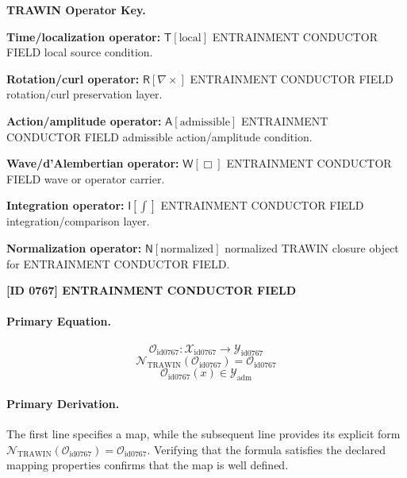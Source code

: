 \par\vspace{0.45\baselineskip}
\noindent\begin{minipage}[t]{\linewidth}
\begingroup
\small
\raggedright
\textbf{TRAWIN Operator Key.}\par
\noindent\textbf{Time/localization operator:} $\mathsf{T}\!\left[\mathrm{local}\right]$ ENTRAINMENT CONDUCTOR FIELD local source condition.\par
\noindent\textbf{Rotation/curl operator:} $\mathsf{R}\!\left[\nabla\times\right]$ ENTRAINMENT CONDUCTOR FIELD rotation/curl preservation layer.\par
\noindent\textbf{Action/amplitude operator:} $\mathsf{A}\!\left[\mathrm{admissible}\right]$ ENTRAINMENT CONDUCTOR FIELD admissible action/amplitude condition.\par
\noindent\textbf{Wave/d'Alembertian operator:} $\mathsf{W}\!\left[\Box\right]$ ENTRAINMENT CONDUCTOR FIELD wave or operator carrier.\par
\noindent\textbf{Integration operator:} $\mathsf{I}\!\left[\int\right]$ ENTRAINMENT CONDUCTOR FIELD integration/comparison layer.\par
\noindent\textbf{Normalization operator:} $\mathsf{N}\!\left[\mathrm{normalized}\right]$ normalized TRAWIN closure object for ENTRAINMENT CONDUCTOR FIELD.\par
\endgroup
\end{minipage}

\clearpage
\noindent\textbf{[ID 0767] ENTRAINMENT CONDUCTOR FIELD}\par
\vspace{0.35em}
\paragraph{Primary Equation.}
\[
\mathcal{O}_{\mathrm{id0767}}:\mathcal{X}_{\mathrm{id0767}}\longrightarrow\mathcal{Y}_{\mathrm{id0767}}
\]
\[
\mathcal{N}_{\mathrm{TRAWIN}}(\mathcal{O}_{\mathrm{id0767}})=\mathcal{O}_{\mathrm{id0767}}
\]
\[
\mathcal{O}_{\mathrm{id0767}}(x)\in\mathcal{Y}_{\mathrm{adm}}
\]

\paragraph{Primary Derivation.}
The first line specifies a map, while the subsequent line provides its explicit form \( \mathcal{N}_{\mathrm{TRAWIN}}(\mathcal{O}_{\mathrm{id0767}})=\mathcal{O}_{\mathrm{id0767}} \). Verifying that the formula satisfies the declared mapping properties confirms that the map is well defined.
